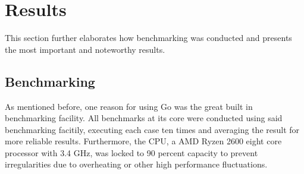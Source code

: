 \section{Results}
This section further elaborates how benchmarking was conducted and presents the most important and noteworthy results.
\subsection{Benchmarking}
As mentioned before, one reason for using Go was the great built in benchmarking facility. All benchmarks at its core were conducted using said benchmarking facitily, executing each case ten times and averaging the result for more reliable results. Furthermore, the CPU, a AMD Ryzen 2600 eight core processor with 3.4 GHz, was locked to 90 percent capacity to prevent irregularities due to overheating or other high performance fluctuations.  

